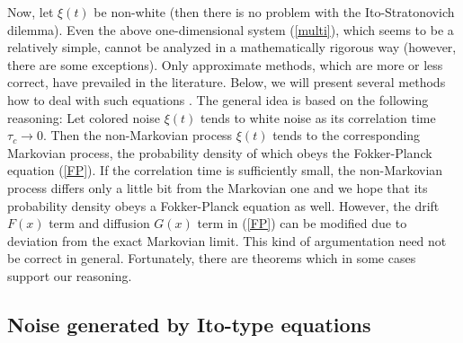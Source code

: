 \documentclass[authoryear,draft,1p,times]{elsarticle}
\renewcommand{\=}{\stackrel{\mathrm{d}}{=}}
\begin{document}
Now,  let  $\xi(t)$ be  non-white (then there is no problem with  the 
Ito-Stratonovich dilemma). 
Even the above one-dimensional system (\ref{multi}), which seems to 
be a relatively simple, cannot be analyzed in a mathematically 
rigorous way (however, there are some exceptions). 
Only approximate methods, which are more or less 
correct, have prevailed in the literature. Below, we will present several 
methods how to deal with such equations \cite{moss,jung}. 
%
The general idea is based on the following reasoning:
Let  colored noise $\xi(t)$ tends to white noise as its correlation 
time $\tau_c \to 0$. Then the non-Markovian process $\xi(t)$ 
tends to the corresponding Markovian process, the 
probability density of which 
obeys  the Fokker-Planck equation (\ref{FP}). If the correlation time 
is sufficiently small, 
the non-Markovian process differs only a little bit from the 
Markovian one and we hope that its   probability density 
obeys a Fokker-Planck 
equation as well. However, the drift $F(x)$ term and diffusion $G(x)$ 
 term in (\ref{FP})  can be modified due to deviation from 
the exact Markovian limit.  
This kind of argumentation need not be correct in general. 
Fortunately, there are  theorems \cite{strat} which in some cases  
   support our  reasoning.   


\subsection{Noise generated by Ito-type equations}
 
\end{document}
